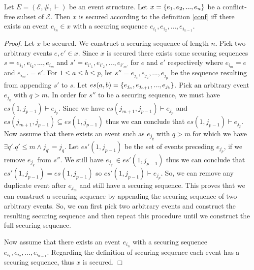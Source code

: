 \documentclass{article}
\begin{document}
\begin{theorem}
    Let $E = (\mathcal{E}, \#, \vdash)$ be an event structure.
    Let $x = \{e_1,e_2,...,e_n\}$ be a conflict-free subset of $\mathcal{E}$.
    Then $x$ is secured according to the definition \ref{conf} iff
    there exists an event $e_{i_n} \in x$ with a securing sequence $e_{i_1},e_{i_2},...,e_{i_{n-1}}$.
\end{theorem}
\begin{proof}
    Let $x$ be secured.
    We construct a securing sequence of length $n$.
    Pick two arbitrary events $e, e' \in x$.
    Since $x$ is secured there exists some securing sequences
    $s = e_{i_1},e_{i_2},...,e_{i_m}$
    and $s' = e_{i'_1},e_{i'_2},...,e_{i'_{m'}}$
    for $e$ and $e'$ respectively where $e_{i_m} = e$
    and $e_{i_{m'}'} = e'$.
    For $1 \leq a \leq b \leq p$,
    let $s'' = e_{j_1},e_{j_2},...,e_{j_p}$
    be the sequence resulting from appending $s'$ to $s$.
    Let $es(a,b) = \{e_{j_a},e_{j_{a+1}},...,e_{j_{b}}\}$.
    Pick an arbitrary event $e_{j_q}$ with $q > m$.
    In order for $s''$ to be a securing sequence, we must have
    $es(1,j_{p-1}) \vdash e_{j_p}$.
    Since we have $es(j_{m+1},j_{p-1}) \vdash e_{j_p}$ and
    $es(j_{m+1},j_{p-1}) \subseteq es(1,j_{p-1})$ thus we can conclude
    that $es(1,j_{p-1}) \vdash e_{j_p}$.
    Now assume that there exists an event such as $e_{j_q}$ with $q > m$ for which we have $\exists q'. q' \leq m \wedge j_{q'} = j_q$.
    Let $es'(1,j_{p-1})$ be the set of events preceding $e_{j_p}$, if we remove $e_{j_q}$ from $s''$.
    We still have $e_{j_{q'}} \in es'(1,j_{p-1})$ thus we can conclude that $es'(1,j_{p-1}) = es(1,j_{p-1})$ so $es'(1,j_{p-1}) \vdash e_{j_{p}}$.
    So, we can remove any duplicate event after $e_{j_m}$ and still
    have a securing sequence.
    This proves that we can construct a securing sequence by
    appending the securing sequence of two arbitrary events.
    So, we can first pick two arbitrary events and construct the
    resulting securing sequence and then repeat this procedure until
    we construct the full securing sequence.

    Now assume that there exists an event $e_{i_n}$ with a securing
    sequence $e_{i_1},e_{i_2},...,e_{i_{n-1}}$.
    Regarding the definition of securing sequence each event has a
    securing sequence, thus $x$ is secured.
\end{proof}
\end{document}
